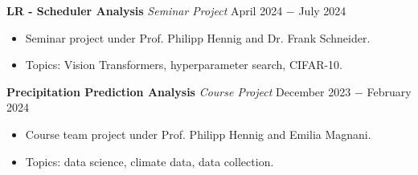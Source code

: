 \documentclass{article}
\begin{document}
\noindent \textbf{LR - Scheduler Analysis} \textit{Seminar Project} \href{https://github.com/RobinU434/LRSchedulerAnalysis}{\faGithubSquare}\hfill April 2024 $-$ July 2024
\begin{itemize}[noitemsep,nolistsep,leftmargin=*]
    \item Seminar project under Prof. Philipp Hennig and Dr. Frank Schneider.
    \item Topics: Vision Transformers, hyperparameter search, CIFAR-10.\\
\end{itemize}


\noindent \textbf{Precipitation Prediction Analysis} \textit{Course Project} \href{https://github.com/RobinU434/PrecipitationPredictionAnalysis}{\faGithubSquare}\hfill December 2023 $-$ February 2024
\begin{itemize}[noitemsep,nolistsep,leftmargin=*]
    \item Course team project under Prof. Philipp Hennig and Emilia Magnani.
    \item Topics: data science, climate data, data collection.\\
\end{itemize}
\end{document}
